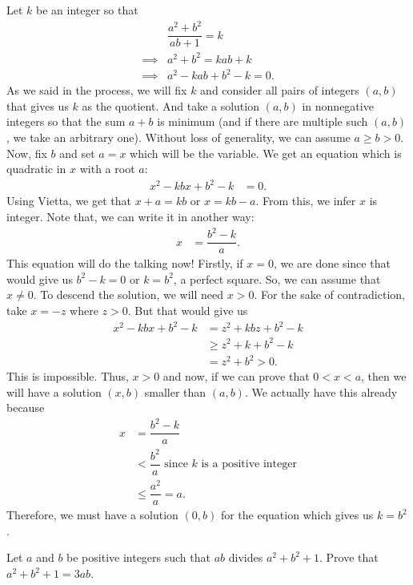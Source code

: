 \documentclass{subfile}
\begin{document}
	\begin{solution}
		Let $k$ be an integer so that
			\begin{align*}
				&\dfrac{a^2+b^2}{ab+1} = k \\
				 \implies & a^2+b^2 = kab+k\\
				\implies  & a^2-kab+b^2-k = 0.
			\end{align*}
		As we said in the process, we will fix $k$ and consider all pairs of integers $(a,b)$ that gives us $k$ as the quotient. And take a solution $(a,b)$ in nonnegative integers so that the sum $a+b$ is minimum (and if there are multiple such $(a,b)$, we take an arbitrary one). Without loss of generality, we can assume $a\geq b>0$. Now, fix $b$ and set $a=x$ which will be the variable. We get an equation which is quadratic in $x$ with a root $a$:
			\begin{align*}
				x^2-kbx+b^2-k & = 0.
			\end{align*}
		Using Vietta, we get that $x+a=kb$ or $x=kb-a$. From this, we infer $x$ is integer. Note that, we can write it in another way:
			\begin{align*}
				x & = \dfrac{b^2-k}{a}.
			\end{align*}
		This equation will do the talking now! Firstly, if $x=0$, we are done since that would give us $b^2-k=0$ or $k=b^2$, a perfect square. So, we can assume that $x\neq0$. To descend the solution, we will need $x>0$. For the sake of contradiction, take $x=-z$ where $z>0$. But that would give us
			\begin{align*}
				x^2-kbx+b^2-k & = z^2+kbz+b^2-k\\
							  &\geq z^2+k+b^2-k\\
							  & = z^2+b^2> 0.
			\end{align*}
		This is impossible. Thus, $x>0$ and now, if we can prove that $0<x<a$, then we will have a solution $(x,b)$ smaller than $(a,b)$. We actually have this already because
			\begin{align*}
				x & = \dfrac{b^2-k}{a}\\
				  & < \dfrac{b^2}{a}\text { since } k\text { is a positive integer}\\
				  &\leq\dfrac{a^2}{a} = a.
			\end{align*}
		Therefore, we must have a solution $(0,b)$ for the equation which gives us $k=b^2$.
	\end{solution}

	\begin{problem}
		Let $a$ and $b$ be positive integers such that $ab$ divides $a^2 + b^2 + 1$. Prove that $a^2 + b^2 + 1=3ab$.
	\end{problem}
\end{document}
